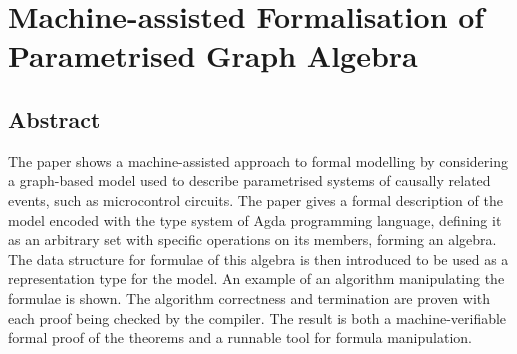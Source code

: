 \newcommand{\framedhslinecorrect}[2]%
  {#1[#2]}

\newcommand{\framedhs}{\sethscode{framedhscode}}


\newenvironment{inlinehscode}%
  {\(\def\column##1##2{}%
   \let\>\undefined\let\<\undefined\let\\\undefined
   \newcommand\>[1][]{}\newcommand\<[1][]{}\newcommand\\[1][]{}%
   \def\fromto##1##2##3{##3}%
   \def\nextline{}}{\) }%

\newcommand{\inlinehs}{\sethscode{inlinehscode}}


\newenvironment{joincode}%
  {\let\orighscode=\hscode
   \let\origendhscode=\endhscode
   \def\endhscode{\def\hscode{\endgroup\def\@currenvir{hscode}\\}\begingroup}
   \orighscode\def\hscode{\endgroup\def\@currenvir{hscode}}}%
  {\origendhscode
   \global\let\hscode=\orighscode
   \global\let\endhscode=\origendhscode}%

\makeatother
\EndFmtInput
%


\chapter{Machine-assisted Formalisation of Parametrised Graph Algebra}

\section{Abstract}
The paper shows a machine-assisted approach to formal modelling by considering a graph-based model used to describe parametrised systems of causally related events, such as microcontrol circuits. The paper gives a formal description of the model encoded with the type system of Agda programming language, defining it as an arbitrary set with specific operations on its members, forming an algebra. The data structure for formulae of this algebra is then introduced to be used as a representation type for the model. An example of an algorithm manipulating the formulae is shown. The algorithm correctness and termination are proven with each proof being checked by the compiler. The result is both a machine-verifiable formal proof of the theorems and a runnable tool for formula manipulation.

